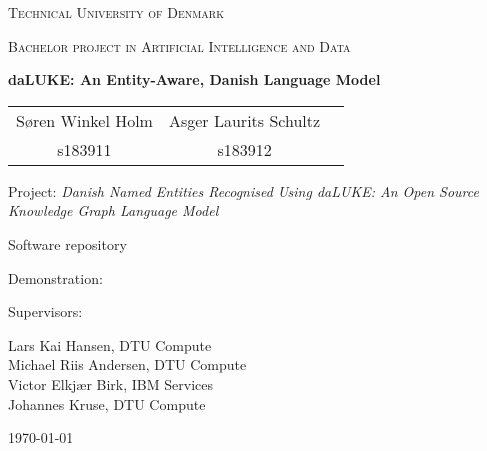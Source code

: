 \documentclass[12pt, fleqn]{report}
\begin{document}
\begin{titlepage}
    \centering
    {\scshape\LARGE Technical University of Denmark \par}
    \vspace{1cm}
    {\scshape\Large Bachelor project in Artificial Intelligence and Data\par}
    \vspace{1.5cm}
    {\huge\bfseries daLUKE: An Entity-Aware, Danish Language Model\par}
    \vspace{2cm}
    \begin{large}
        \centering
        \begin{tabular}{ccc}
                Søren Winkel Holm & Asger Laurits Schultz\\
                s183911 & s183912
        \end{tabular}
    \end{large}\par
    \vfill
    Project: \textit{Danish Named Entities Recognised Using daLUKE: An Open Source Knowledge Graph Language Model}\par
    Software repository
    \par
    Demonstration:
    \par
    \vspace{2cm}
    Supervisors:\par
    Lars Kai Hansen, DTU Compute\\
    Michael Riis Andersen, DTU Compute\\
    Victor Elkjær Birk, IBM Services\\
    Johannes Kruse, DTU Compute
    \vfill
    {\large \today\par}
\end{titlepage}
\begin{abstract}
    Previous Danish Named Entity Recognition (NER) Results reproduced.
    The English-speaking NER performance of LUKE \cite{yamada2020luke} reproduced.
    A Danish version of LUKE pretrained on Danish text corpus presented as  with NER as a benchmark.
\end{abstract}

\setcounter{tocdepth}{1}
\tableofcontents
\setcounter{tocdepth}{2}







% 

% 

% 

\printbibliography[heading=bibintoc]

% 
\end{document}
